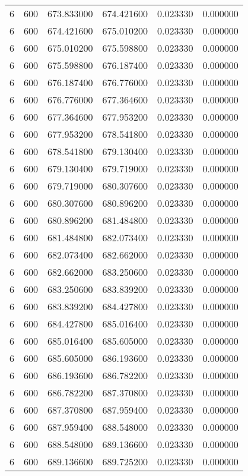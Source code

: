\begin{longtable}{rrrrrr}
6 & 600 & 673.833000 & 674.421600 & 0.023330 & 0.000000 \\
6 & 600 & 674.421600 & 675.010200 & 0.023330 & 0.000000 \\
6 & 600 & 675.010200 & 675.598800 & 0.023330 & 0.000000 \\
6 & 600 & 675.598800 & 676.187400 & 0.023330 & 0.000000 \\
6 & 600 & 676.187400 & 676.776000 & 0.023330 & 0.000000 \\
6 & 600 & 676.776000 & 677.364600 & 0.023330 & 0.000000 \\
6 & 600 & 677.364600 & 677.953200 & 0.023330 & 0.000000 \\
6 & 600 & 677.953200 & 678.541800 & 0.023330 & 0.000000 \\
6 & 600 & 678.541800 & 679.130400 & 0.023330 & 0.000000 \\
6 & 600 & 679.130400 & 679.719000 & 0.023330 & 0.000000 \\
6 & 600 & 679.719000 & 680.307600 & 0.023330 & 0.000000 \\
6 & 600 & 680.307600 & 680.896200 & 0.023330 & 0.000000 \\
6 & 600 & 680.896200 & 681.484800 & 0.023330 & 0.000000 \\
6 & 600 & 681.484800 & 682.073400 & 0.023330 & 0.000000 \\
6 & 600 & 682.073400 & 682.662000 & 0.023330 & 0.000000 \\
6 & 600 & 682.662000 & 683.250600 & 0.023330 & 0.000000 \\
6 & 600 & 683.250600 & 683.839200 & 0.023330 & 0.000000 \\
6 & 600 & 683.839200 & 684.427800 & 0.023330 & 0.000000 \\
6 & 600 & 684.427800 & 685.016400 & 0.023330 & 0.000000 \\
6 & 600 & 685.016400 & 685.605000 & 0.023330 & 0.000000 \\
6 & 600 & 685.605000 & 686.193600 & 0.023330 & 0.000000 \\
6 & 600 & 686.193600 & 686.782200 & 0.023330 & 0.000000 \\
6 & 600 & 686.782200 & 687.370800 & 0.023330 & 0.000000 \\
6 & 600 & 687.370800 & 687.959400 & 0.023330 & 0.000000 \\
6 & 600 & 687.959400 & 688.548000 & 0.023330 & 0.000000 \\
6 & 600 & 688.548000 & 689.136600 & 0.023330 & 0.000000 \\
6 & 600 & 689.136600 & 689.725200 & 0.023330 & 0.000000 \\

\end{longtable}
